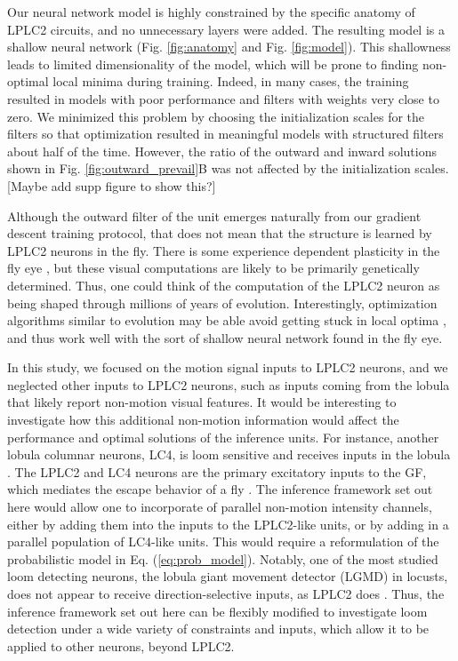 \documentclass[pdftex,9pt,lineno]{elife}
\begin{document}
Our neural network model is highly constrained by the specific anatomy of LPLC2 circuits, and no unnecessary layers were added. The resulting model is a shallow neural network (Fig. \ref{fig:anatomy} and Fig. \ref{fig:model}). This shallowness leads to limited dimensionality of the model, which will be prone to finding non-optimal local minima during training. Indeed, in many cases, the training resulted in models with poor performance and filters with weights very close to zero. We minimized this problem by choosing the initialization scales for the filters so that optimization resulted in meaningful models with structured filters about half of the time. However, the ratio of the outward and inward solutions shown in Fig. \ref{fig:outward_prevail}B was not affected by the initialization scales. [Maybe add supp figure to show this?]

Although the outward filter of the unit emerges naturally from our gradient descent training protocol, that does not mean that the structure is learned by LPLC2 neurons in the fly. There is some experience dependent plasticity in the fly eye \citep{kikuchi2012experience}, but these visual computations are likely to be primarily genetically determined. Thus, one could think of the computation of the LPLC2 neuron as being shaped through millions of years of evolution. Interestingly, optimization algorithms similar to evolution may be able avoid getting stuck in local optima \citep{stanley2019designing}, and thus work well with the sort of shallow neural network found in the fly eye.

In this study, we focused on the motion signal inputs to LPLC2 neurons, and we neglected other inputs to LPLC2 neurons, such as inputs coming from the lobula that likely report non-motion visual features. It would be interesting to investigate how this additional non-motion information would affect the performance and optimal solutions of the inference units. For instance, another lobula columnar neurons, LC4, is loom sensitive and receives inputs in the lobula \citep{von2017feature}. The LPLC2 and LC4 neurons are the primary excitatory inputs to the GF, which mediates the escape behavior of a fly \citep{von2014spike, ache2019neural}. The inference framework set out here would allow one to incorporate of parallel non-motion intensity channels, either by adding them into the inputs to the LPLC2-like units, or by adding in a parallel population of LC4-like units. This would require a reformulation of the probabilistic model in Eq. (\ref{eq:prob_model}). Notably, one of the most studied loom detecting neurons, the lobula giant movement detector (LGMD) in locusts, does not appear to receive direction-selective inputs, as LPLC2 does \citep{rind1996neural,gabbiani1999computation}. Thus, the inference framework set out here can be flexibly modified to investigate loom detection under a wide variety of constraints and inputs, which allow it to be applied to other neurons, beyond LPLC2. 
\end{document}
